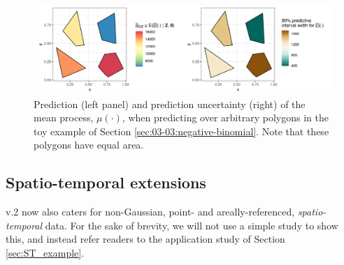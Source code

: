 \documentclass[article]{jss}
\begin{document}
\begin{figure}[t!]
    \centering
    \includegraphics[width = \linewidth]{img/Negbinom_sim_arbitrary_polygon_predictions.png}
    \caption{Prediction (left panel) and prediction uncertainty (right) of the mean process, $\mu(\cdot)$, when predicting over arbitrary polygons in the toy example of Section \ref{sec:03-03:negative-binomial}. Note that these polygons have equal area.}   
  \label{fig:03-02-negative-binomial_polygons}
\end{figure}




%


\subsection{Spatio-temporal extensions}\label{sec:03:Additonal_features}

 v.2 now also caters for non-Gaussian, point- and areally-referenced, \textit{spatio-temporal} data. 
For the sake of brevity, we will not use a simple study to show this, and instead refer readers to the application study of Section \ref{sec:ST_example}. 
\end{document}
